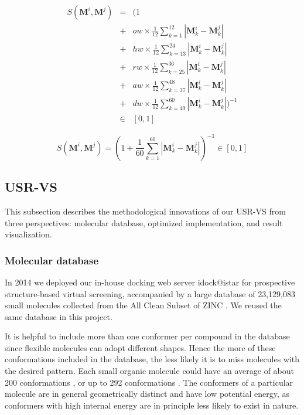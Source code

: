 \documentclass[a4,center,fleqn]{NAR}
\begin{document}
\begin{eqnarray}
S(\mathbf M^i, \mathbf M^j)&=&(1\nonumber\\
&+&ow\times\frac{1}{12}\sum_{k= 1}^{12}|\mathbf M_k^i-\mathbf M_k^j|\nonumber\\
&+&hw\times\frac{1}{12}\sum_{k=13}^{24}|\mathbf M_k^i-\mathbf M_k^j|\nonumber\\
&+&rw\times\frac{1}{12}\sum_{k=25}^{36}|\mathbf M_k^i-\mathbf M_k^j|\nonumber\\
&+&aw\times\frac{1}{12}\sum_{k=37}^{48}|\mathbf M_k^i-\mathbf M_k^j|\nonumber\\
&+&dw\times\frac{1}{12}\sum_{k=49}^{60}|\mathbf M_k^i-\mathbf M_k^j|)^{-1}\nonumber\\
&\in&[0, 1]
\label{usrcat0score}
\end{eqnarray}

\begin{equation}
S(\mathbf M^i, \mathbf M^j)=(1+\frac{1}{60}\sum_{k=1}^{60}|\mathbf M_k^i-\mathbf M_k^j|)^{-1}\in[0, 1]
\label{usrcatscore}
\end{equation}

\subsection{USR-VS}

This subsection describes the methodological innovations of our USR-VS from three perspectives: molecular database, optimized implementation, and result visualization.

\subsubsection{Molecular database}

In 2014 we deployed our in-house docking web server idock@istar \cite{1362} for prospective structure-based virtual screening, accompanied by a large database of 23,129,083 small molecules collected from the All Clean Subset of ZINC \cite{532,1178}. We reused the same database in this project.

It is helpful to include more than one conformer per compound in the database since flexible molecules can adopt different shapes. Hence the more of these conformations included in the database, the less likely it is to miss molecules with the desired pattern. Each small organic molecule could have an average of about 200 conformations \cite{1332}, or up to 292 conformations \cite{1280}. The conformers of a particular molecule are in general geometrically distinct and have low potential energy, as conformers with high internal energy are in principle less likely to exist in nature.
\end{document}
